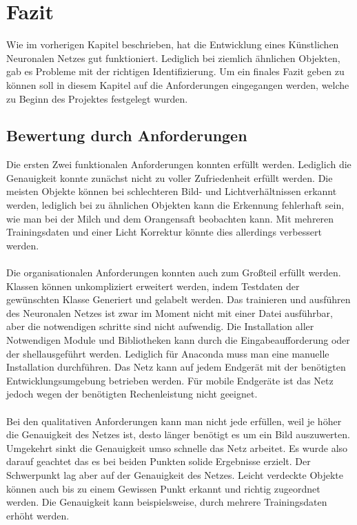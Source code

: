 \documentclass[a4paper,12pt,oneside]{article}
\begin{document}
\section{Fazit}
Wie im vorherigen Kapitel beschrieben, hat die Entwicklung eines Künstlichen Neuronalen Netzes gut funktioniert. Lediglich bei ziemlich ähnlichen Objekten, gab es Probleme mit der richtigen Identifizierung. Um ein finales Fazit geben zu können soll in diesem Kapitel auf die Anforderungen eingegangen werden, welche zu Beginn des Projektes festgelegt wurden.\\

\subsection{Bewertung durch Anforderungen}

Die ersten Zwei funktionalen Anforderungen konnten erfüllt werden. Lediglich die Genauigkeit konnte zunächst nicht zu voller Zufriedenheit erfüllt werden. Die meisten Objekte können bei schlechteren Bild- und Lichtverhältnissen erkannt werden, lediglich bei zu ähnlichen Objekten kann die Erkennung fehlerhaft sein, wie man bei der Milch und dem Orangensaft beobachten kann. Mit mehreren Trainingsdaten und einer Licht Korrektur könnte dies allerdings verbessert werden.\\
\\
Die organisationalen Anforderungen konnten auch zum Großteil erfüllt werden. Klassen können unkompliziert erweitert werden, indem Testdaten der gewünschten Klasse Generiert und gelabelt werden. Das trainieren und ausführen des Neuronalen Netzes ist zwar im Moment nicht mit einer Datei ausführbar, aber die notwendigen schritte sind nicht aufwendig. Die Installation aller Notwendigen Module und Bibliotheken kann durch die Eingabeaufforderung oder der \glqq shell\grqq ausgeführt werden. Lediglich für Anaconda muss man eine manuelle Installation durchführen. Das Netz kann auf jedem Endgerät mit der benötigten Entwicklungsumgebung betrieben werden. Für mobile Endgeräte ist das Netz jedoch wegen der benötigten Rechenleistung nicht geeignet.\\
\\
Bei den qualitativen Anforderungen kann man nicht jede erfüllen, weil je höher die Genauigkeit des Netzes ist, desto länger benötigt es um ein Bild auszuwerten. Umgekehrt sinkt die Genauigkeit umso schnelle das Netz arbeitet. Es wurde also darauf geachtet das es bei beiden Punkten solide Ergebnisse erzielt. Der Schwerpunkt lag aber auf der Genauigkeit des Netzes. Leicht verdeckte Objekte können auch bis zu einem Gewissen Punkt erkannt und richtig zugeordnet werden. Die Genauigkeit kann beispielsweise, durch mehrere Trainingsdaten erhöht werden.\\
\end{document}
